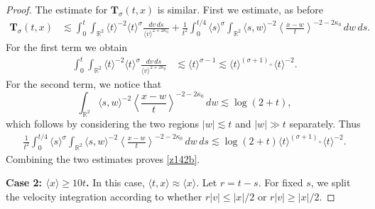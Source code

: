 \documentclass[reqno,11pt]{amsart}
\numberwithin{equation}{section}
\begin{document}
\begin{proof}
		The estimate for $\mathbf{T}_{\sigma}(t,x)$ is similar. First we estimate, as before
	\begin{align*}
	\mathbf T_\sigma(t,x)
	&\lesssim
	\int_0^t\int_{\mathbb R^2}
	\langle t\rangle^{-2}
	\langle t\rangle^\sigma
	\frac{dv\,ds}{\langle v\rangle^{2+2\kappa_0}}+
	\frac{1}{t^2}
	\int_0^{t/4}
	\langle s\rangle^\sigma
	\int_{\mathbb R^2}
	\langle s,w\rangle^{-2}
	\left\langle\frac{x-w}{t}\right\rangle^{-2-2\kappa_0}
	\,dw\,ds.
\end{align*}
For the first term we obtain
\begin{align*}
	\int_0^t\int_{\mathbb R^2}
	\langle t\rangle^{-2}
	\langle t\rangle^\sigma
	\frac{dv\,ds}{\langle v\rangle^{2+2\kappa_0}}
	&\lesssim
	\langle t\rangle^{\sigma-1}
	\lesssim
	\langle t\rangle^{(\sigma+1)_+}\langle t\rangle^{-2}.
\end{align*}
For the second term, we notice that
\begin{equation*}
	\int_{\mathbb R^2}
	\langle s,w\rangle^{-2}
	\left\langle\frac{x-w}{t}\right\rangle^{-2-2\kappa_0}
	\,dw
	\lesssim
	\log(2+t),
\end{equation*}
which follows by considering the two regions $|w|\lesssim t$ and $|w|\gg t$ separately. Thus
\begin{align*}
	\frac{1}{t^2}
	\int_0^{t/4}
	\langle s\rangle^\sigma
	\int_{\mathbb R^2}
	\langle s,w\rangle^{-2}
	\left\langle\frac{x-w}{t}\right\rangle^{-2-2\kappa_0}
	\,dw\,ds\lesssim
	\log(2+t)\langle t\rangle^{(\sigma+1)_+}\langle t\rangle^{-2}.
\end{align*}
Combining the two estimates proves \eqref{z142b}.
		\medskip

{\bf{Case 2: $\langle x\rangle\geq 10t$.}}
In this case, $\langle t,x\rangle\approx\langle x\rangle$. Let
$r=t-s$. For fixed $s$, we split the velocity
integration according to whether $r|v|\leq |x|/2$ or $r|v|\geq |x|/2$.


\end{proof}
\end{document}
